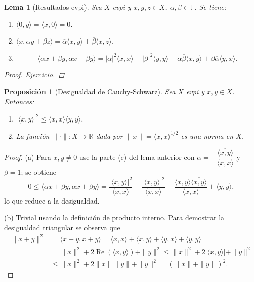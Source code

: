 \documentclass[11pt]{article}
\theoremstyle{definition}
\theoremstyle{plain}
\newtheorem{lemma}[definition]{Lema}
\newtheorem{proposition}[definition]{Proposición}
\begin{document}
\begin{lemma}[Resultados evpi]
Sea $X$ evpi y $x,y,z\in X$, $\alpha,\beta\in\mathbb{F}$. Se tiene:
\begin{enumerate}[label=\alph*)]
\item $\langle 0,y\rangle=\langle x,0\rangle=0$.
\item $\langle x,\alpha y+\beta z\rangle=\overline{\alpha}\langle x,y\rangle+\overline{\beta}\langle x,z\rangle$.
\item
\[\langle\alpha x+\beta y,\alpha x+\beta y\rangle=|\alpha|^2\langle x,x\rangle+|\beta|^2\langle y,y\rangle+\alpha\overline{\beta}\langle x,y\rangle+\beta\overline{\alpha}\langle y,x\rangle.\]
\end{enumerate}
\begin{proof}
Ejercicio.
\end{proof}
\end{lemma}

\begin{proposition}[Desigualdad de Cauchy-Schwarz]
Sea $X$ evpi y $x,y\in X$. Entonces:
\begin{enumerate}[label=\alph*)]
\item $|\langle x,y\rangle|^2\le\langle x,x\rangle\langle y,y\rangle$.
\item La función $\|\cdot\|:X\to\mathbb{R}$ dada por $\|x\|=\langle x,x\rangle^{1/2}$ es una norma en $X$.
\end{enumerate}
\end{proposition}

\begin{proof}
(a) Para $x,y\neq0$ use la parte (c) del lema anterior con
$\alpha=-\dfrac{\overline{\langle x,y\rangle}}{\langle x,x\rangle}$ y $\beta=1$; se obtiene
\[0\le\langle\alpha x+\beta y,\alpha x+\beta y\rangle=\frac{|\langle x,y\rangle|^2}{\langle x,x\rangle}-\frac{|\langle x,y\rangle|^2}{\langle x,x\rangle}-\frac{\langle x,y\rangle\overline{\langle x,y\rangle}}{\langle x,x\rangle}+\langle y,y\rangle,
\]
lo que reduce a la desigualdad.

(b) Trivial usando la definición de producto interno. Para demostrar la desigualdad triangular se observa que
\begin{align*}
\|x+y\|^{2}&=\langle x+y,x+y\rangle=\langle x,x\rangle+\langle x,y\rangle+\langle y,x\rangle+\langle y,y\rangle\\
&=\|x\|^2+2\operatorname{Re}(\langle x,y\rangle)+\|y\|^2\le\|x\|^2+2|\langle x,y\rangle|+\|y\|^2\\
&\le\|x\|^2+2\|x\|\|y\|+\|y\|^2=(\|x\|+\|y\|)^2.
\end{align*}
\end{proof}
\end{document}
